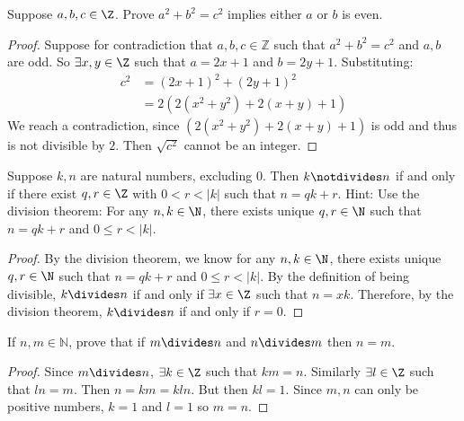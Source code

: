 \documentclass[12pt]{article}
\begin{document}
\begin{problem}
Suppose $a,b,c \in \Z$. Prove $a^2 + b^2 = c^2$ implies either $a$ or $b$ is even.

\begin{proof}
Suppose for contradiction that $a,b,c \in \mathbb{Z}$ such that $a^2 + b^2 = c^2$ and $a,b$ are odd. So $\exists x,y \in \Z$ such that $a = 2x + 1$ and $b = 2y + 1$. Substituting:
\begin{align*}
    c^2 
    &= (2x + 1)^2 + (2y + 1)^2 \\
    &= 2(2(x^2 + y^2) + 2(x + y) + 1)
\end{align*}
We reach a contradiction, since $(2(x^2 + y^2) + 2(x + y) + 1)$ is odd and thus is not divisible by $2$. Then $\sqrt{c^2}$ cannot be an integer.
\end{proof}
\end{problem}

\begin{problem}
Suppose $k,n$ are natural numbers, excluding 0. Then $k \notdivides n$ if and only if there exist $q,r \in \Z$ with $0 < r < |k|$ such that $n = qk + r$. Hint: Use the division theorem: For any $n, k \in \N$, there exists unique $q,r \in \N$ such that $n = qk + r$ and $0 \leq r < |k|$.

\begin{proof}
By the division theorem, we know for any $n, k \in \N$, there exists unique $q,r \in \N$ such that $n = qk + r$ and $0 \leq r < |k|$. By the definition of being divisible, $k \divides n$ if and only if $\exists x \in \Z$ such that $n = xk$. Therefore, by the division theorem, $k \divides n$ if and only if $r = 0$.
\end{proof}
\end{problem}

\begin{problem}
If $n,m \in \mathbb{N}$, prove that if $m \divides n$ and $n \divides m$ then $n = m$.

\begin{proof}
Since $m \divides n$, $\exists k \in \Z$ such that $km = n$. Similarly $\exists l \in \Z$ such that $ln = m$. Then $n = km = kln$. But then $kl = 1$. Since $m,n$ can only be positive numbers, $k=1$ and $l=1$ so $m = n$.
\end{proof}
\end{problem}
\end{document}
